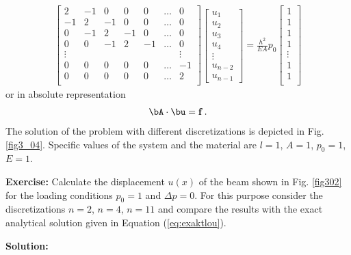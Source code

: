 \begin{eqnarray}
\left[
\begin{array}{ccccccc}
 2    & -1 & 0  & 0  & 0  & \dots & 0 \\
-1    & 2  & -1 & 0  & 0  & \dots & 0 \\
 0    & -1 & 2  & -1 & 0  & \dots & 0 \\ 
 0    & 0  & -1 & 2  & -1 & \dots & 0\\
\vdots&    &    &    &    &       & \vdots \\
 0    & 0  & 0  & 0  & 0  & \dots & -1\\
 0    & 0  & 0  & 0  & 0  & \dots & 2\\
\end{array}
\right]
\left[
\begin{array}{c}
 u_1    \\  
 u_2    \\ 
 u_3    \\ 
 u_4    \\
 \vdots \\ 
 u_{n-2}\\ 
 u_{n-1}     
\end{array}
\right]
= \frac{h^2}{EA} p_0
\left[
\begin{array}{c}
 1 \\
 1 \\ 
 1 \\
 1 \\    
 \vdots \\ 
 1 \\    
 1 \\
\end{array}
\right]
\end{eqnarray}
%
or in absolute representation
%
\begin{eqnarray}
\bA \cdot \bu = {\bf f} \, .
\end{eqnarray}
%
The solution of the problem with different discretizations
is depicted in Fig. \ref{fig3_04}. 
Specific values of the system and the material are
$l=1$, $A=1$, $p_0=1$, $E=1$.
%

\vspace{1.5cm}
{\bf Exercise:} 
Calculate the displacement $u(x)$ of the beam shown 
in Fig. \ref{fig302} for the loading conditions 
$p_0 = 1$ and $\Delta p = 0$. 
For this purpose consider the discretizations 
$n=2$, $n=4$, $n=11$ and compare the results 
with the exact analytical solution given in 
Equation (\ref{eq:exaktlou}). 

\clearpage
{\bf Solution: }

